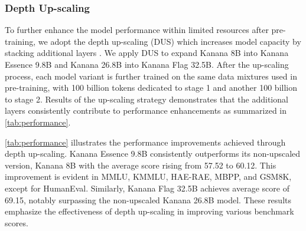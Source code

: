 \subsubsection{Depth Up-scaling}
\label{subsec:pretrain_dus}

To further enhance the model performance within limited resources after pre-training, we adopt the depth up-scaling (DUS) which increases model capacity by stacking additional layers \citep{kim2023solar}.
We apply DUS to expand Kanana 8B into Kanana Essence 9.8B and Kanana 26.8B into Kanana Flag 32.5B.
After the up-scaling process, each model variant is further trained on the same data mixtures used in pre-training, with 100 billion tokens dedicated to stage 1 and another 100 billion to stage 2.
Results of the up-scaling strategy demonstrates that the additional layers consistently contribute to performance enhancements as summarized in \autoref{tab:performance}.
\begin{table}[ht]
    \centering
    \caption{Performance comparison of Kanana models before and after depth up-scaling.}
    \label{tab:performance}
\end{table}

\autoref{tab:performance} illustrates the performance improvements achieved through depth up-scaling.
Kanana Essence 9.8B consistently outperforms its non-upscaled version, Kanana 8B with the average score rising from 57.52 to 60.12. 
This improvement is evident in MMLU, KMMLU, HAE-RAE, MBPP, and GSM8K, except for HumanEval. 
Similarly, Kanana Flag 32.5B achieves average score of 69.15, notably surpassing the non-upscaled Kanana 26.8B model. 
These results emphasize the effectiveness of depth up-scaling in improving various benchmark scores.



